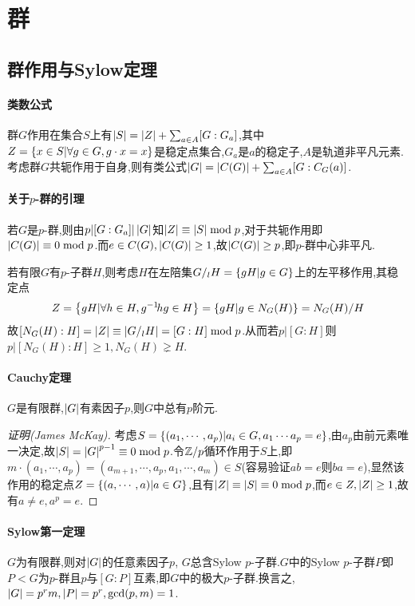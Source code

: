 \documentclass{article}
\begin{document}
\newpage
\section{群}
\subsection{群作用与Sylow定理}
\paragraph{类数公式}
群$G$作用在集合$S$上有$\left|S\right|=\left|Z\right|+\sum_{a\in A} [G:G_a]$,其中$Z=\left\{x\in S|\forall g\in G, g\cdot x=x\right\}$是稳定点集合,$G_a$是$a$的稳定子,$A$是轨道非平凡元素.考虑群$G$共轭作用于自身,则有类公式$\left|G\right|=\left|C(G)\right|+\sum_{a\in A}[G:C_G(a)]$.

\paragraph{关于$p$-群的引理}
若$G$是$p$-群,则由$p|[G:G_a]|\left|G\right|$知$\left|Z\right|\equiv \left|S\right|\bmod p$,对于共轭作用即$\left|C(G)\right|\equiv 0\bmod p$.而$e\in C(G),\left|C(G)\right|\geq 1$,故$\left|C(G)\right|\geq p$,即$p$-群中心非平凡.

若有限$G$有$p$-子群$H$,则考虑$H$在左陪集$G/_l H=\left\{gH|g\in G\right\}$上的左平移作用,其稳定点
$$Z=\left\{gH|\forall h\in H, g^{-1}\! hg\in H\right\}=\left\{gH|g\in N_G(H)\right\}=N_G(H)/H$$
故$[N_G(H):H]=\left|Z\right|\equiv \left|G/_l H\right|=[G:H]\bmod p$.从而若$p|[G:H]$则$p|[N_G(H):H]\geq 1, N_G(H)\gneq H$.

\paragraph{Cauchy定理}
$G$是有限群,$\left|G\right|$有素因子$p$,则$G$中总有$p$阶元.

\begin{proof}[证明(James McKay)]
    考虑$S=\left\{(a_1,\cdots,a_p)|a_i\in G, a_1\cdots a_p=e\right\}$,由$a_p$由前元素唯一决定,故$\left|S\right|=\left|G\right|^{p-1}\equiv 0\bmod p$.令$\mathbb{Z}/p$循环作用于$S$上,即$m\cdot(a_1,\cdots,a_p)=(a_{m+1},\cdots,a_p,a_1,\cdots,a_m)\in S$(容易验证$ab=e$则$ba=e$),显然该作用的稳定点$Z=\left\{(a,\cdots,a)|a\in G\right\}$,且有$\left|Z\right|\equiv\left|S\right|\equiv 0\bmod p$,而$e\in Z, \left|Z\right|\geq 1$,故有$a\neq e, a^p=e$.
\end{proof}

\paragraph{Sylow第一定理}
$G$为有限群,则对$\left|G\right|$的任意素因子$p$, $G$总含Sylow $p$-子群.$G$中的Sylow $p$-子群$P$即$P<G$为$p$-群且$p$与$[G:P]$互素,即$G$中的极大$p$-子群.换言之,$\left|G\right|=p^rm, \left|P\right|=p^r, \gcd(p,m)=1$.
\end{document}
